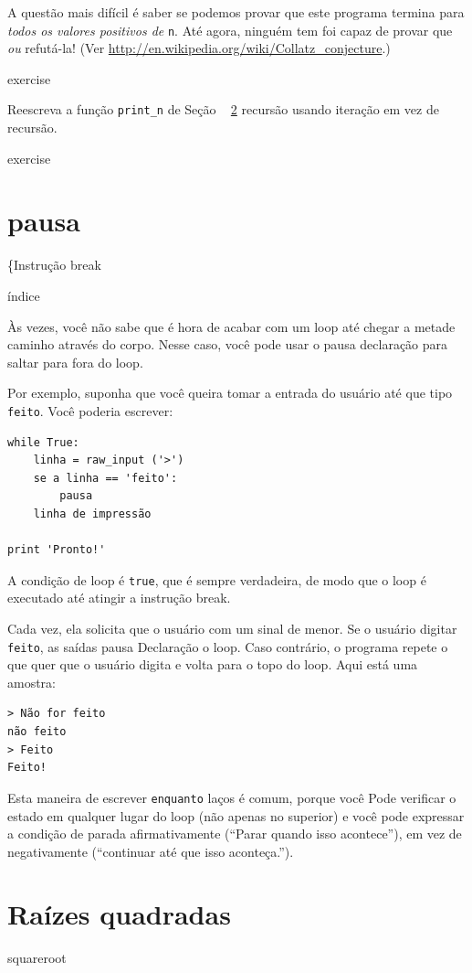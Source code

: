 \documentclass[10pt]{book}
\begin{document}
\begin{exercise}
{{A questão mais difícil é saber se podemos provar que este programa termina
para {\em todos os valores positivos de} {\tt n}. Até agora, ninguém tem
foi capaz de provar que {\em ou} refutá-la! (Ver
  \url{http://en.wikipedia.org/wiki/Collatz_conjecture}.)

\begin{} exercise

Reescreva a função \verb "print_n" de
Seção ~ \ref {} recursão usando iteração em vez de recursão.

\end{} exercise


\section{{pausa \tt}}
\{Instrução break} índice

Às vezes, você não sabe que é hora de acabar com um loop até chegar a metade
caminho através do corpo. Nesse caso, você pode usar o {pausa \tt}
declaração para saltar para fora do loop.

Por exemplo, suponha que você queira tomar a entrada do usuário até que
tipo {\tt feito}. Você poderia escrever:

\begin{verbatim}
while True:
    linha = raw_input ('>')
    se a linha == 'feito':
        pausa
    linha de impressão

print 'Pronto!'
\end{verbatim}
%
A condição de loop é {\tt true}, que é sempre verdadeira, de modo que o
loop é executado até atingir a instrução break.

Cada vez, ela solicita que o usuário com um sinal de menor.
Se o usuário digitar {\tt feito}, as saídas {pausa \tt} Declaração
o loop. Caso contrário, o programa repete o que quer que o usuário digita
e volta para o topo do loop. Aqui está uma amostra:

\begin{verbatim}
> Não for feito
não feito
> Feito
Feito!
\end{verbatim}
%
Esta maneira de escrever {\tt enquanto} laços é comum, porque você
Pode verificar o estado em qualquer lugar do loop (não apenas no
superior) e você pode expressar a condição de parada afirmativamente
(``Parar quando isso acontece''), em vez de negativamente (``continuar
até que isso aconteça.'').


\section{Raízes quadradas}
\label{} squareroot

}
\end{exercise}
\end{document}
